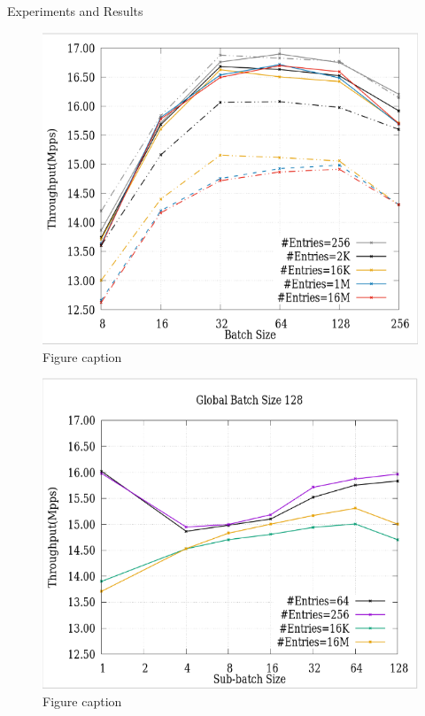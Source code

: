 \documentclass[final]{beamer}
\newlength{\twocolwid}
\begin{document}
\begin{frame}
\begin{columns}[t]
\begin{column}{\twocolwid}
\begin{columns}[t,totalwidth=\twocolwid]
\begin{column}{\twocolwid}
\begin{exampleblock}{ Experiments and Results}
\begin{multicols}{3}
\begin{figure}
\includegraphics[width=1\linewidth]{img/throughput_sensitivity_B}
\caption{Figure caption}
\end{figure}

\begin{figure}
\includegraphics[width=1\linewidth]{img/throughput_sensitivity_b}
\caption{Figure caption}
\end{figure}


 
\end{multicols}
\end{exampleblock}


\end{column}
\end{columns}
\end{column}
\end{columns}
\end{frame}
\end{document}
